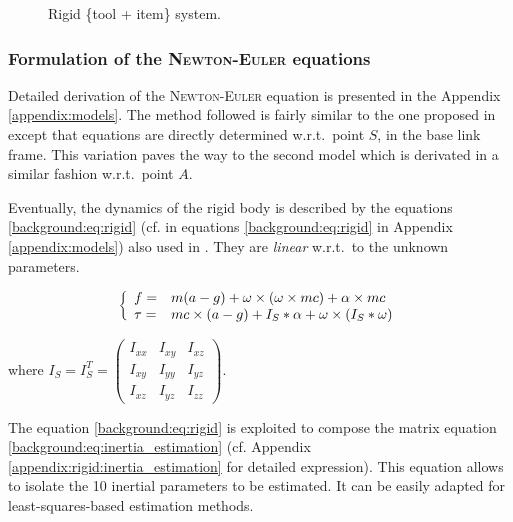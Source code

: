 \documentclass[/home/francois/latex/report/main.tex]{subfiles}
\begin{document}
\begin{figure}
\centering
   \caption{Rigid \{tool + item\} system.}
   \label{fig:tikz:one_body}
\end{figure}

\subsubsection{Formulation of the \textsc{Newton-Euler} equations}
\label{subsubsection:background_newton_equation}

Detailed derivation of the \textsc{Newton-Euler} equation is presented in the Appendix \ref{appendix:models}. The method followed is fairly similar to the one proposed in \cite{An1985} except that equations are directly determined w.r.t.\ point $S$, in the base link frame. This variation paves the way to the second model which is derivated in a similar fashion w.r.t.\ point $A$.

Eventually, the dynamics of the rigid body is described by the equations \ref{background:eq:rigid} (cf. in equations \ref{background:eq:rigid} in Appendix \ref{appendix:models}) also used in \cite{Kubus2008, Kubus2007, Kubus2014, Farsoni2018}. They are \textit{linear} w.r.t.\ to the unknown parameters.

\begin{equation}
 \label{background:eq:rigid}
 \left \{
 \begin{array}{l l}
  f =    & m (a - g) + \omega \times (\omega \times m c) + \alpha \times m c \\
  \tau = & m c \times (a - g)
  + I_{S} \ast \alpha + \omega \times (I_{S} \ast \omega)
 \end{array}
 \right.
\end{equation}

where $I_S = I_S^T =
\begin{pmatrix}
 I_{xx} & I_{xy} & I_{xz} \\
 I_{xy} & I_{yy} & I_{yz} \\
 I_{xz} & I_{yz} & I_{zz}
\end{pmatrix}
$.

The equation \ref{background:eq:rigid} is exploited to compose the matrix equation \ref{background:eq:inertia_estimation} (cf. Appendix \ref{appendix:rigid:inertia_estimation} for detailed expression). This equation allows to isolate the 10 inertial parameters to be estimated. It can be easily adapted for least-squares-based estimation methods.
\end{document}
